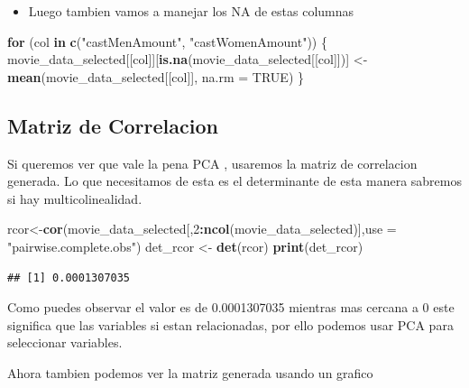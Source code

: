 \documentclass[
]{article}
\newenvironment{Shaded}{\begin{snugshade}}{\end{snugshade}}
\newcommand{\AttributeTok}[1]{\textcolor[rgb]{0.13,0.29,0.53}{#1}}
\newcommand{\ConstantTok}[1]{\textcolor[rgb]{0.56,0.35,0.01}{#1}}
\newcommand{\ControlFlowTok}[1]{\textcolor[rgb]{0.13,0.29,0.53}{\textbf{#1}}}
\newcommand{\DecValTok}[1]{\textcolor[rgb]{0.00,0.00,0.81}{#1}}
\newcommand{\FunctionTok}[1]{\textcolor[rgb]{0.13,0.29,0.53}{\textbf{#1}}}
\newcommand{\NormalTok}[1]{#1}
\newcommand{\OtherTok}[1]{\textcolor[rgb]{0.56,0.35,0.01}{#1}}
\newcommand{\SpecialCharTok}[1]{\textcolor[rgb]{0.81,0.36,0.00}{\textbf{#1}}}
\newcommand{\StringTok}[1]{\textcolor[rgb]{0.31,0.60,0.02}{#1}}
\providecommand{\tightlist}{%
  \setlength{\itemsep}{0pt}\setlength{\parskip}{0pt}}
\begin{document}
\begin{itemize}
\tightlist
\item
  Luego tambien vamos a manejar los NA de estas columnas
\end{itemize}

\begin{Shaded}
\begin{Highlighting}[]
\ControlFlowTok{for}\NormalTok{ (col }\ControlFlowTok{in} \FunctionTok{c}\NormalTok{(}\StringTok{"castMenAmount"}\NormalTok{, }\StringTok{"castWomenAmount"}\NormalTok{)) \{}
\NormalTok{  movie\_data\_selected[[col]][}\FunctionTok{is.na}\NormalTok{(movie\_data\_selected[[col]])] }\OtherTok{\textless{}{-}} \FunctionTok{mean}\NormalTok{(movie\_data\_selected[[col]], }\AttributeTok{na.rm =} \ConstantTok{TRUE}\NormalTok{)}
\NormalTok{\}}
\end{Highlighting}
\end{Shaded}

\subsection{Matriz de Correlacion}\label{matriz-de-correlacion}

Si queremos ver que vale la pena PCA , usaremos la matriz de correlacion
generada. Lo que necesitamos de esta es el determinante de esta manera
sabremos si hay multicolinealidad.

\begin{Shaded}
\begin{Highlighting}[]
\NormalTok{rcor}\OtherTok{\textless{}{-}}\FunctionTok{cor}\NormalTok{(movie\_data\_selected[,}\DecValTok{2}\SpecialCharTok{:}\FunctionTok{ncol}\NormalTok{(movie\_data\_selected)],}\AttributeTok{use =} \StringTok{"pairwise.complete.obs"}\NormalTok{)}
\NormalTok{det\_rcor }\OtherTok{\textless{}{-}} \FunctionTok{det}\NormalTok{(rcor)}
\FunctionTok{print}\NormalTok{(det\_rcor)}
\end{Highlighting}
\end{Shaded}

\begin{verbatim}
## [1] 0.0001307035
\end{verbatim}

Como puedes observar el valor es de 0.0001307035 mientras mas cercana a
0 este significa que las variables si estan relacionadas, por ello
podemos usar PCA para seleccionar variables.

Ahora tambien podemos ver la matriz generada usando un grafico
\end{document}
